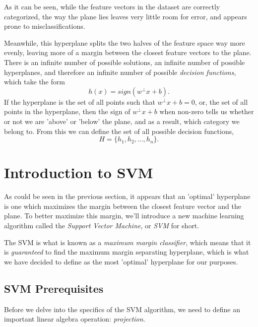 As it can be seen, while the feature vectors in the dataset are correctly categorized, the way the plane lies leaves very little room for error, and appears prone to misclassifications.


Meanwhile, this hyperplane splits the two halves of the feature space way more evenly, leaving more of a margin between the closest feature vectors to the plane. There is an infinite number of possible solutions, an infinite number of possible hyperplanes, and therefore an infinite number of possible \textit{decision functions}, which take the form
\[
    h(x) = sign(w^\perp x+b).
\]
If the hyperplane is the set of all points such that $w^\perp x+b=0$, or, the set of all points in the hyperplane, then the sign of $w^\perp x+b$ when non-zero tells us whether or not we are 'above' or 'below' the plane, and as a result, which category we belong to. From this we can define the set of all possible decision functions,
\[
    H = \{h_1, h_2, \dots, h_n\}.
\]

\section{Introduction to SVM}
As could be seen in the previous section, it appears that an 'optimal' hyperplane is one which maximizes the margin between the closest feature vector and the plane. To better maximize this margin, we'll introduce a new machine learning algorithm called the \textit{Support Vector Machine}, or \textit{SVM} for short.

The SVM is what is known as a \textit{maximum margin classifier}, which means that it is \textit{guaranteed} to find the maximum margin separating hyperplane, which is what we have decided to define as the most 'optimal' hyperplane for our purposes.

\subsection{SVM Prerequisites}
Before we delve into the specifics of the SVM algorithm, we need to define an important linear algebra operation: \textit{projection}.

